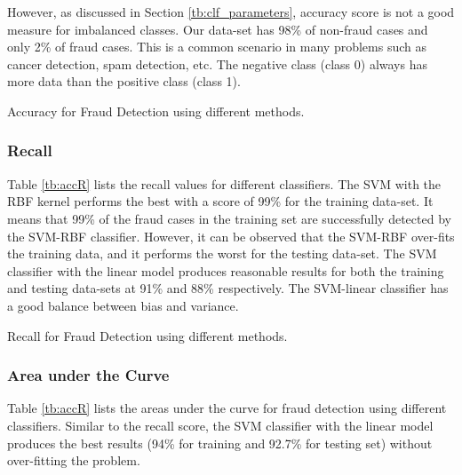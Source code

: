 However, as discussed in Section \ref{tb:clf_parameters}, accuracy score is not a good measure for imbalanced classes. Our data-set has 98\% of non-fraud cases and only 2\% of fraud cases. This is a common scenario in many problems such as cancer detection, spam detection, etc. The negative class (class 0) always has more data than the positive class (class 1).

\begin{table}[!ht]
\centering
{}
\caption{Accuracy for Fraud Detection using different methods.}\label{tb:accR}
\end{table}

\subsubsection{\textbf{Recall}}

Table \ref{tb:accR} lists the recall values for different classifiers. The SVM with the RBF kernel performs the best with a score of 99\% for the training data-set. It means that 99\% of the fraud cases in the training set are successfully detected by the SVM-RBF classifier. However, it can be observed that the SVM-RBF over-fits the training data, and it performs the worst for the testing data-set. The SVM classifier with the linear model produces reasonable results for both the training and testing data-sets at 91\% and 88\% respectively. The SVM-linear classifier has a good balance between bias and variance.

\begin{table}[!ht]
\centering
{}
\caption{Recall for Fraud Detection using different methods.}\label{tb:recallR}
\end{table}

\subsubsection{\textbf{Area under the Curve}}
Table \ref{tb:accR} lists the areas under the curve for fraud detection using different classifiers. Similar to the recall score, the SVM classifier with the linear model produces the best results (94\% for training and 92.7\% for testing set) without over-fitting the problem.

